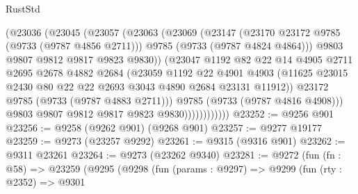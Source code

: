\begin{lexlean}{RustStd}
\begin{coremodule}
                        (@23036
                          (@23045
                            (@23057
                              (@23063
                                (@23069
                                  (@23147
                                    (@23170 @23172 @9785 (@9733 (@9787 @4856 @2711)))
                                    @9785
                                    (@9733 (@9787 @4824 @4864)))
                                  @9803
                                  @9807
                                  @9812
                                  @9817
                                  @9823
                                  @9830))
                              (@23047
                                @1192
                                @82
                                @22
                                @14
                                @4905
                                @2711
                                @2695
                                @2678
                                @4882
                                @2684
                                (@23059
                                  @1192
                                  @22
                                  @4901
                                  @4903
                                  (@11625
                                    @23015
                                    @2430
                                    @80
                                    @22
                                    @22
                                    @2693
                                    @3043
                                    @4890
                                    @2684
                                    @23131
                                    @11912))
                                @23172
                                @9785
                                (@9733 (@9787 @4883 @2711)))
                              @9785
                              (@9733 (@9787 @4816 @4908)))
                            @9803
                            @9807
                            @9812
                            @9817
                            @9823
                            @9830))))))))))))
@23252 := @9256 @901
@23256 := @9258 (@9262 @901) (@9268 @901)
@23257 := @9277 @19177
@23259 := @9273 (@23257 @9292)
@23261 := @9315 (@9316 @901)
@23262 := @9311 @23261
@23264 := @9273 (@23262 @9340)
@23281 := @9272
    (fun (fn : @58) =>
    @23259
      (@9295
        (@9298
          (fun (params : @9297) =>
          @9299
            (fun (rty : @2352) =>
            @9301

\end{coremodule}
\end{lexlean}
